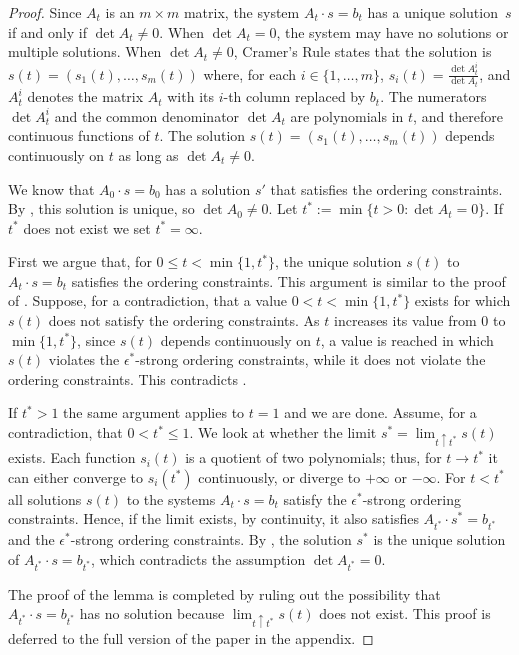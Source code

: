 \begin{proof}
	Since $A_t$ is an $m\times m$ matrix, the system $A_t\cdot
	s=b_t$ has a unique solution~$s$ if and only if $\det A_t \neq 0$.
	When $\det A_t =0$, the system may have no solutions or
	multiple solutions.  
	When $\det A_t\neq 0$, 
	Cramer's Rule states that
	the solution
	is $s(t)=(s_1(t),\ldots,s_m(t))$ where, for each
	$i\in\{1,\ldots,m\}$, $s_i(t) = \frac{\det A_t^i}{\det A_t }$,
	and $A_t^i$ denotes the matrix $A_t$ with its $i$-th column replaced
	by $b_t$. 
	The numerators $\det A_t^i$ and the common
	denominator $\det A_t $ are polynomials in $t$, and therefore
	continuous
	functions of $t$.
	The solution $s(t)=(s_1(t),\ldots,s_m(t))$ depends continuously on $t$
	as long as  $\det A_t\ne0 $.
	
	
	We know that $A_0\cdot s=b_0$ has a solution $s'$ that satisfies the ordering constraints. By , this solution is unique, so $\det A_0\neq 0$.
	Let $t^*:=\min \{t>0 :\det A_{t}= 0\}$. If $t^*$ does not exist we set $t^*=\infty$.
	
	First we argue that, for $0\le t <\min \{1,t^*\}$, the unique solution $s(t)$ to $A_t\cdot s=b_t$ satisfies the ordering constraints. This argument is similar to the proof of . Suppose, for a contradiction, that a value $0<t<\min\{1,t^*\}$ exists for which $s(t)$ does not satisfy the ordering constraints. As $t$ increases its value from $0$ to $\min\{1,t^*\}$, since $s(t)$ depends continuously on $t$, a value is reached in which $s(t)$ violates the $\epsilon^*$-strong ordering constraints, while it does not violate the ordering constraints. This contradicts	.
	
	If $t^*>1$ the same argument applies to $t=1$ and we are done.
	Assume, for a contradiction, that $0<t^*\le 1$.
	We look at whether the limit $s^*=\lim_{t\uparrow t^*}
	s(t)$ exists.
	Each function $s_i(t)$ is a quotient of two polynomials; thus, for $t\to t^*$ it can either converge to $s_i(t^*)$ continuously, or diverge to $+\infty$ or $-\infty$.
	For $t<t^*$ all solutions $s(t)$ to the systems $A_t\cdot s=b_t$ satisfy the $\epsilon^*$-strong ordering constraints.
	Hence, if the limit exists, by continuity, it also satisfies $A_{t^*}\cdot s^*=b_{t^*}$
	and the $\epsilon^*$-strong ordering constraints.
	By , the solution $s^*$ is
	the unique solution
	of $A_{t^*}\cdot s=b_{t^*}$, which contradicts the assumption
	$\det A_{t^*}= 0$.
	
	The proof of the lemma is completed by ruling out the possibility that $A_{t^*}\cdot s=b_{t^*}$ has no solution because $\lim_{t\uparrow t^*} s(t)$ does not exist. This proof is deferred to the full version of the paper in the appendix. 
\end{proof}
